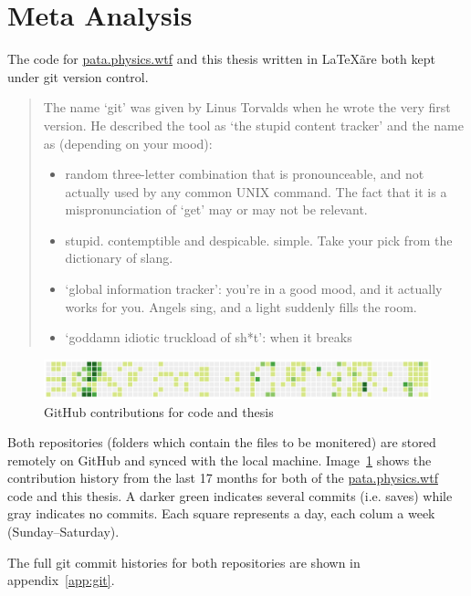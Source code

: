 \section{Meta Analysis}

The code for \url{pata.physics.wtf} and this thesis written in \LaTeX \~are both kept under git version control.

\begin{quotation}
  The name `git' was given by Linus Torvalds when he wrote the very first version. He described the tool as `the stupid content tracker' and the name as (depending on your mood):
  \begin{itemize}
    \item random three-letter combination that is pronounceable, and not actually used by any common UNIX command. The fact that it is a mispronunciation of `get' may or may not be relevant.
    \item stupid. contemptible and despicable. simple. Take your pick from the dictionary of slang.
    \item `global information tracker': you're in a good mood, and it actually works for you. Angels sing, and a light suddenly fills the room.
    \item `goddamn idiotic truckload of sh*t': when it breaks 
  \end{itemize} 
\end{quotation}

\begin{figure}[!htbp] %
  \centering
  \includegraphics[width=\linewidth]{images/github0}
\caption[GitHub contributions]{GitHub contributions for code and thesis}
\label{img:github}
\end{figure}

Both repositories (folders which contain the files to be monitered) are stored remotely on GitHub \autocite{GitHub2016} and synced with the local machine. Image~\ref{img:github} shows the contribution history from the last 17 months for both of the \url{pata.physics.wtf} code and this thesis. A darker green indicates several commits (i.e. saves) while gray indicates no commits. Each square represents a day, each colum a week (Sunday--Saturday).

The full git commit histories for both repositories are shown in appendix~\ref{app:git}. 


\stopcontents[chapters]
